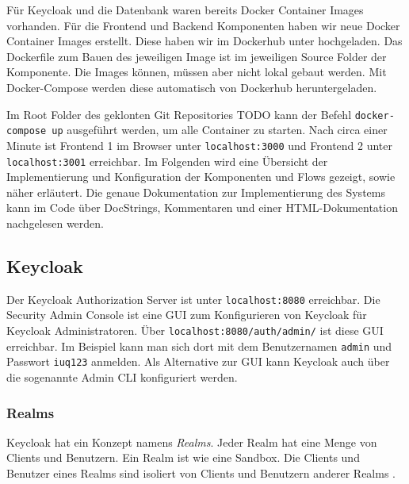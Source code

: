 Für Keycloak und die Datenbank waren bereits Docker Container Images vorhanden. Für die Frontend und Backend Komponenten haben wir neue Docker Container Images erstellt. Diese haben wir im Dockerhub unter \cite{EB42} hochgeladen. Das Dockerfile zum Bauen des jeweiligen Image ist im jeweiligen Source Folder der Komponente. Die Images können, müssen aber nicht lokal gebaut werden. Mit Docker-Compose werden diese automatisch von Dockerhub heruntergeladen.

Im Root Folder des geklonten Git Repositories TODO kann der Befehl \texttt{docker-compose up} ausgeführt werden, um alle Container zu starten. Nach circa einer Minute ist Frontend 1 im Browser unter \texttt{localhost:3000} und Frontend 2 unter \texttt{localhost:3001} erreichbar. Im Folgenden wird eine Übersicht der Implementierung und Konfiguration der Komponenten und Flows gezeigt, sowie näher erläutert. Die genaue Dokumentation zur Implementierung des Systems kann im Code über DocStrings, Kommentaren und einer HTML-Dokumentation nachgelesen werden.


\subsection{Keycloak} \label{EB_Keycloak}

Der Keycloak Authorization Server ist unter \texttt{localhost:8080} erreichbar. Die Security Admin Console ist eine GUI zum Konfigurieren von Keycloak für Keycloak Administratoren. Über \texttt{localhost:8080/auth/admin/} ist diese GUI erreichbar. Im Beispiel kann man sich dort mit dem Benutzernamen \texttt{admin} und Passwort \texttt{iuq123} anmelden. Als Alternative zur GUI kann Keycloak auch über die sogenannte Admin CLI konfiguriert werden.

\subsubsection{Realms}\label{Realms}

Keycloak hat ein Konzept namens \textit{Realms}. Jeder Realm hat eine Menge von Clients und Benutzern. Ein Realm ist wie eine Sandbox. Die Clients und Benutzer eines Realms sind isoliert von Clients und Benutzern anderer Realms \cite[Core Concepts and Terms]{keycloakDocs}.


